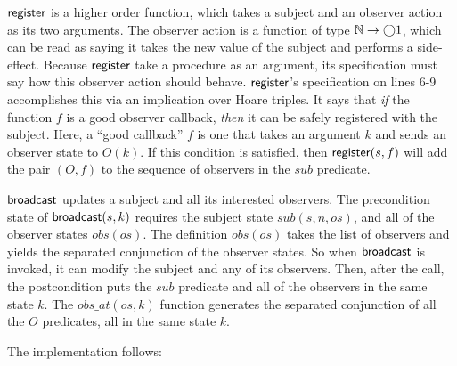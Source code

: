 $\mathsf{register}$ is a higher order function, which takes a subject
and an observer action as its two arguments. The observer action is a
function of type $\mathbb{N} \to \bigcirc{1}$, which can be read as saying it
takes the new value of the subject and performs a side-effect. Because
$\mathsf{register}$ take a procedure as an argument, its specification
must say how this observer action should behave. $\mathsf{register}$'s
specification on lines 6-9 accomplishes this via an implication over
Hoare triples. It says that \emph{if} the function $f$ is a good
observer callback, \emph{then} it can be safely registered with the
subject. Here, a ``good callback'' $f$ is one that takes an argument
$k$ and sends an observer state to $O(k)$. If this condition is
satisfied, then $\mathsf{register}(s, f)$ will add the pair $(O,f)$ to
the sequence of observers in the $sub$ predicate.

$\mathsf{broadcast}$ updates a subject and all its interested
observers.  The precondition state of $\mathsf{broadcast}(s,k)$
requires the subject state $sub(s,n,os)$, and all of the observer
states $obs(os)$. The definition $obs(os)$ takes the list of observers
and yields the separated conjunction of the observer states. So when
$\mathsf{broadcast}$ is invoked, it can modify the subject and any of
its observers. Then, after the call, the postcondition puts the $sub$
predicate and all of the observers in the same state $k$. The
$obs\_at(os,k)$ function generates the separated conjunction of all
the $O$ predicates, all in the same state $k$.

The implementation follows:

